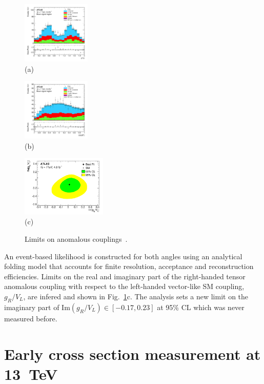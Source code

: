 \documentclass{PoS}
\begin{document}
\begin{figure}[htbp]
\begin{center}
\parbox[t]{0.3\textwidth}{\centering\includegraphics[width=0.29\textwidth]{atlas_anomcoupl/phi.pdf}\\(a)}
\parbox[t]{0.3\textwidth}{\centering\includegraphics[width=0.29\textwidth]{atlas_anomcoupl/theta.pdf}\\(b)}
\parbox[t]{0.38\textwidth}{\centering\includegraphics[width=0.36\textwidth]{atlas_anomcoupl/limits.pdf}\\(c)}
\end{center}
\caption{\label{fig:angles}Limits on anomalous couplings~\cite{atlas-anomcoupl}.}
\end{figure}

An event-based likelihood is constructed for both angles using an analytical folding model that accounts for finite resolution, acceptance and reconstruction efficiencies. Limits on the real and imaginary part of the right-handed tensor anomalous coupling with respect to the left-handed vector-like SM coupling, $g_{R}/V_{L}$, are infered and shown in Fig.~\ref{fig:angles}c. The analysis sets a new limit on the imaginary part of $\mathrm{Im}(g_{R}/V_{L})\in[-0.17,0.23]$ at 95\% CL which was never measured before.




\section{Early cross section measurement at 13~TeV}
\end{document}
